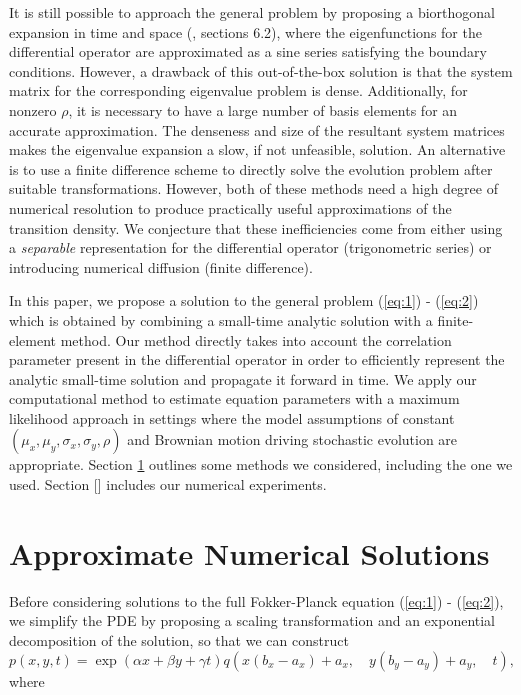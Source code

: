 \documentclass[10pt]{article}
\begin{document}
It is still possible to approach the general problem by proposing a
biorthogonal expansion in time and space
(\cite{risken1989fokker-planck}, sections 6.2), where the
eigenfunctions for the differential operator are approximated as a
sine series satisfying the boundary conditions. However, a drawback of
this out-of-the-box solution is that the system matrix for the
corresponding eigenvalue problem is dense. Additionally, for nonzero
$\rho$, it is necessary to have a large number of basis elements for
an accurate approximation. The denseness and size of the resultant
system matrices makes the eigenvalue expansion a slow, if not
unfeasible, solution. An alternative is to use a finite difference
scheme to directly solve the evolution problem after suitable
transformations. However, both of these methods need a high degree of
numerical resolution to produce practically useful approximations of
the transition density. We conjecture that these inefficiencies come
from either using a \textit{separable} representation for the
differential operator (trigonometric series) or introducing numerical
diffusion (finite difference).

In this paper, we propose a solution to the general problem
(\ref{eq:1}) - (\ref{eq:2}) which is obtained by combining a
small-time analytic solution with a finite-element method. Our method
directly takes into account the correlation parameter present in the
differential operator in order to efficiently represent the analytic
small-time solution and propagate it forward in time. We apply our
computational method to estimate equation parameters with a maximum
likelihood approach in settings where the model assumptions of
constant $(\mu_x, \mu_y, \sigma_x, \sigma_y, \rho)$ and Brownian
motion driving stochastic evolution are appropriate. Section
\ref{sec:approximate-sols} outlines some methods we considered,
including the one we used. Section [] includes our numerical
experiments.


\section{Approximate Numerical Solutions} \label{sec:approximate-sols}
Before considering solutions to the full Fokker-Planck equation
(\ref{eq:1}) - (\ref{eq:2}), we simplify the PDE by proposing a
scaling transformation and an exponential decomposition of the
solution, so that we can construct
\[
  p(x,y,t) = \exp(\alpha x + \beta y + \gamma t) q\left( x(b_x - a_x) + a_x, \quad y(b_y - a_y) + a_y, \quad t \right),
\]
where
\end{document}
